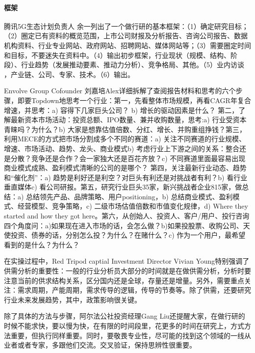 \documentclass[letterpaper,11pt,english]{sphinxmanual}
\begin{document}
\paragraph{框架}
\label{\detokenize{chapter_skill/industry_analysis:id12}}
腾讯5G生态计划负责人
余一列出了一个做行研的基本框架：（1）确定研究目标；（2）圈定已有资料的概览范围，上市公司财报及分析报告、咨询公司报告、数据机构资料、行业专业网站、政府网站、招聘网站、媒体网站等；（3）需要圈定时间和目标，不要迷失在资料中。（4）输出初步框架，行业现状（规模、结构、阶段）、行业趋势（发展推动要素、推动力分析）、竞争格局、其他。（5）业内访谈
，产业链、公司、专家、技术。（6）输出。

Envolve Group Co\sphinxhyphen{}founder
刘嘉培Alex详细拆解了查阅报告材料和思考的六个步骤，即要Top\sphinxhyphen{}down地思考一个行业：第一，先看整体市场规模，再看CAGR年复合增速，并思考：a)
容得下几家巨头公司？ b) 增长的驱动因素是什么？
第二，了解最新资本市场活动：投资总额、IPO数量、兼并收购数量，思考:a)
行业受资本青睐吗？为什么？b)
大家是想靠估值倍数、分红、增长、并购重组挣钱？第三，利用MECE的方式把市场分割成多个不同的赛道：a)
关注不同赛道的行业规模、增速、市场活动、趋势、龙头、商业模式b)
考虑行业上下游之间的关系：整合还是分散？竞争还是合作？会一家独大还是百花齐放？c)
不同赛道里面最容易出现商业模式成熟、盈利模式清晰的公司的是哪个？
第四，关注最新行业动态、趋势和“催化剂”：a)
趋势是利好还是利空？对巨头有利还是对挑战者有利？b) 看行业垂直媒体c)
看公司研报。第五，研究行业巨头3\sphinxhyphen{}5家，新兴挑战者企业8\sphinxhyphen{}15家，做总结：a)
总结领先产品、品牌策略、用户positioning，b)
总结商业模式、盈利模式、经营模型、竞争策略，c)
二级市场估值倍数和市值变化规律，d) Where they started and how they got
here。第六，从创始人、投资人、客户/用户、投行咨询四个角度问：a)如果现在进入市场的话，会怎么做？b)如果投股票、收购公司、天使投资、债券的话，分别怎么投？为什么？在赌什么？c)
作为一个用户，最希望看到的是什么？为什么？

在实操过程中，Red Tripod captial Investment Director Vivian
Young特别强调了供需分析的重要性：一般的行业分析员大部分的时间就是在做供需分析，分析时要注意当前的供求结构关系，区分国内还是全球，存量还是增量。另外，需要重点关注：需求周期，产能周期，需求传导的逻辑，传导的节奏等。除了供需，还要研究行业未来发展趋势，其中，政策影响很关键。

除了具体的方法与步骤，阿尔法公社投资经理Gang
Liu还提醒大家，在做行研的时候不能求快，要以慢为快，在有限的时间段里，花更多的时间在研究上，方式方法重要，但执行同样重要。同时，要敬畏专业性，尽可能的找到这个领域的一线从业者或者专家，多跟他们交流。交叉验证，保持思辨性很重要。
\end{document}

